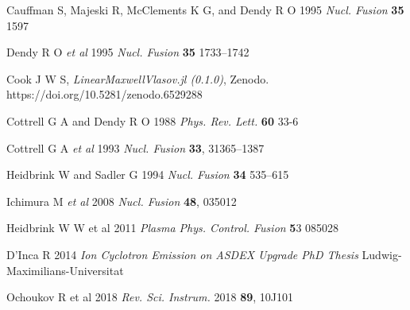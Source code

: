 \documentclass[12pt]{iopart}
\begin{document}
\begin{thebibliography}{9}

Cauffman S, Majeski R, McClements K G, and Dendy R O 1995 \textit{Nucl. Fusion} \textbf{35} 1597

  Dendy R O \textit{et al} 1995 \textit{Nucl. Fusion} \textbf{35} 1733–1742

  Cook J W S, \textit{LinearMaxwellVlasov.jl (0.1.0)}, Zenodo. https://doi.org/10.5281/zenodo.6529288

Cottrell G A and Dendy R O 1988 \textit{Phys. Rev. Lett.} \textbf{60} 33-6

Cottrell G A \textit{et al} 1993 \textit{Nucl. Fusion} \textbf{33}, 31365–1387
% 

Heidbrink W and Sadler G 1994 \textit{Nucl. Fusion} \textbf{34} 535–615

Ichimura M \textit{et al} 2008 \textit{Nucl. Fusion} \textbf{48}, 035012

Heidbrink W W et al 2011 \textit{Plasma Phys. Control. Fusion} {\textbf 53} 085028

D’Inca R 2014 \textit{Ion Cyclotron Emission on ASDEX Upgrade PhD Thesis} Ludwig-Maximilians-Universitat

Ochoukov R et al 2018 \textit{Rev. Sci. Instrum.} 2018 \textbf{89}, 10J101


\end{thebibliography}
\end{document}
